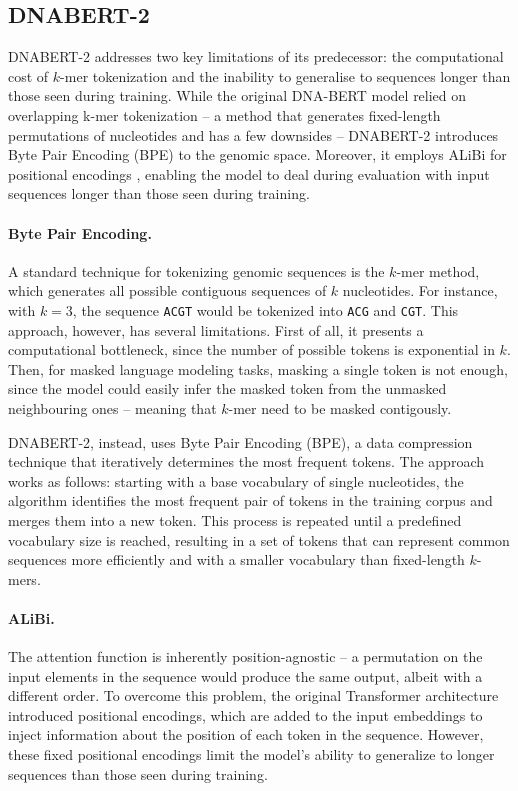 \documentclass[11pt,a4paper,twoside]{article}
\begin{document}
\subsection{DNABERT-2}
DNABERT-2 \cite{dnabert-2} addresses two key limitations of its predecessor: the computational cost of $k$-mer tokenization and the inability to generalise to sequences longer than those seen during training. 
While the original DNA-BERT model relied on overlapping k-mer tokenization \cite{dnabert} -- a method that generates fixed-length permutations of nucleotides and has a few downsides -- DNABERT-2 introduces Byte Pair Encoding (BPE) to the genomic space.
Moreover, it employs ALiBi for positional encodings \cite{alibi}, enabling the model to deal during evaluation with input sequences longer than those seen during training.

\paragraph{Byte Pair Encoding.} A standard technique for tokenizing genomic sequences is the $k$-mer method, which generates all possible contiguous sequences of $k$ nucleotides. For instance, with $k=3$, the sequence \texttt{ACGT} would be tokenized into \texttt{ACG} and \texttt{CGT}. 
This approach, however, has several limitations. First of all, it presents a computational bottleneck, since the number of possible tokens is exponential in $k$. Then, for masked language modeling tasks, masking a single token is not enough, since the model could easily infer the masked token from the unmasked neighbouring ones -- meaning that $k$-mer need to be masked contigously.

DNABERT-2, instead, uses Byte Pair Encoding (BPE), a data compression technique that iteratively determines the most frequent tokens.
The approach works as follows: starting with a base vocabulary of single nucleotides, the algorithm identifies the most frequent pair of tokens in the training corpus and merges them into a new token. 
This process is repeated until a predefined vocabulary size is reached, resulting in a set of tokens that can represent common sequences more efficiently and with a smaller vocabulary than fixed-length $k$-mers.

\paragraph{ALiBi.} The attention function is inherently position-agnostic -- a permutation on the input elements in the sequence would produce the same output, albeit with a different order. 
To overcome this problem, the original Transformer architecture introduced positional encodings, which are added to the input embeddings to inject information about the position of each token in the sequence. 
However, these fixed positional encodings limit the model's ability to generalize to longer sequences than those seen during training.
\end{document}
